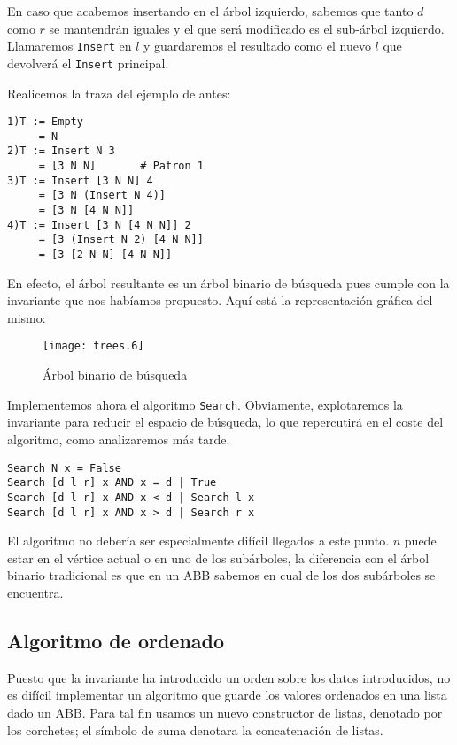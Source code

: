 \documentclass[10pt,spanish,twocolumn]{article}
\begin{document}
En caso que acabemos insertando en el árbol izquierdo, sabemos que tanto $d$ 
como $r$ se mantendrán iguales y el que será modificado es el sub-árbol 
izquierdo.  Llamaremos \texttt{Insert} en $l$ y guardaremos el resultado como 
el nuevo $l$ que devolverá el \texttt{Insert} principal.

Realicemos la traza del ejemplo de antes:

\begin{lstlisting}
1)T := Empty
     = N
2)T := Insert N 3
     = [3 N N]       # Patron 1
3)T := Insert [3 N N] 4
     = [3 N (Insert N 4)]
     = [3 N [4 N N]]
4)T := Insert [3 N [4 N N]] 2
     = [3 (Insert N 2) [4 N N]]
     = [3 [2 N N] [4 N N]]
\end{lstlisting}

En efecto, el árbol resultante es un árbol binario de búsqueda pues cumple con 
la invariante que nos habíamos propuesto.  Aquí está la representación gráfica 
del mismo:

\begin{figure}[h]
    \centering
    \texttt{[image: trees.6]}
    \caption{Árbol binario de búsqueda}
    \label{fig:tree3}
\end{figure}

Implementemos ahora el algoritmo \texttt{Search}.  Obviamente, explotaremos la 
invariante para reducir el espacio de búsqueda, lo que repercutirá en el coste 
del algoritmo, como analizaremos más tarde.

\begin{lstlisting}
Search N x = False
Search [d l r] x AND x = d | True
Search [d l r] x AND x < d | Search l x
Search [d l r] x AND x > d | Search r x
\end{lstlisting}

El algoritmo no debería ser especialmente difícil llegados a este punto.  $n$ 
puede estar en el vértice actual o en uno de los subárboles, la diferencia con 
el árbol binario tradicional es que en un ABB sabemos en cual de los dos 
subárboles se encuentra.

\subsection{Algoritmo de ordenado}
Puesto que la invariante ha introducido un orden sobre los datos introducidos, 
no es difícil implementar un algoritmo que guarde los valores ordenados en una 
lista dado un ABB.  Para tal fin usamos un nuevo constructor de listas, 
denotado por los corchetes; el símbolo de suma denotara la concatenación de 
listas.
\end{document}
